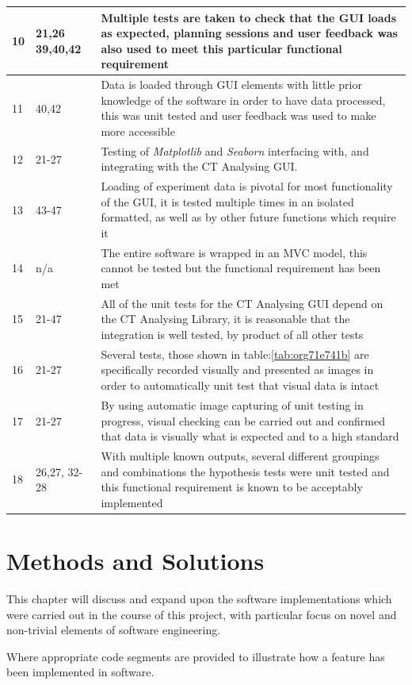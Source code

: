 \documentclass[11pt]{report}
\begin{document}
\begin{longtable}{|l|l|p{14cm}|}
\hline
10 & 21,26 39,40,42 & Multiple tests are taken to check that the GUI loads as expected, planning sessions and user feedback was also used to meet this particular functional requirement\\
\hline
11 & 40,42 & Data is loaded through GUI elements with little prior knowledge of the software in order to have data processed, this was unit tested and user feedback was used to make more accessible\\
\hline
12 & 21-27 & Testing of \emph{Matplotlib} and \emph{Seaborn} interfacing with, and integrating with the CT Analysing GUI.\\
\hline
13 & 43-47 & Loading of experiment data is pivotal for most functionality of the GUI, it is tested multiple times in an isolated formatted, as well as by other future functions which require it\\
\hline
14 & n/a & The entire software is wrapped in an MVC model, this cannot be tested but the functional requirement has been met\\
\hline
15 & 21-47 & All of the unit tests for the CT Analysing GUI depend on the CT Analysing Library, it is reasonable that the integration is well tested, by product of all other tests\\
\hline
16 & 21-27 & Several tests, those shown in table:\ref{tab:org71e741b} are specifically recorded visually and presented as images in order to automatically unit test that visual data is intact\\
\hline
17 & 21-27 & By using automatic image capturing of unit testing in progress, visual checking can be carried out and confirmed that data is visually what is expected and to a high standard\\
\hline
18 & 26,27, 32-28 & With multiple known outputs, several different groupings and combinations the hypothesis tests were unit tested and this functional requirement is known to be acceptably implemented\\
\hline
\end{longtable}

\chapter{Methods and Solutions}
\label{sec:org96294ed}
This chapter will discuss and expand upon the software implementations which were carried out in the course of this project, with particular focus on novel and non-trivial elements of software engineering.

Where appropriate code segments are provided to illustrate how a feature has been implemented in software.
\end{document}
